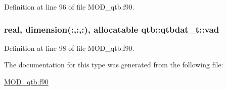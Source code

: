 Definition at line 96 of file M\-O\-D\-\_\-qtb.\-f90.

\hypertarget{structqtb_1_1qtbdat__t_a200f1e2ce88d50e34844f23530956eff}{
\subsubsection[{vad}]{\setlength{\rightskip}{0pt plus 5cm}real, dimension(\-:,\-:,\-:), allocatable qtb\-::qtbdat\-\_\-t\-::vad}}\label{structqtb_1_1qtbdat__t_a200f1e2ce88d50e34844f23530956eff}


Definition at line 98 of file M\-O\-D\-\_\-qtb.\-f90.



The documentation for this type was generated from the following file\-:\begin{DoxyCompactItemize}
\item 
\hyperlink{MOD__qtb_8f90}{M\-O\-D\-\_\-qtb.\-f90}\end{DoxyCompactItemize}
